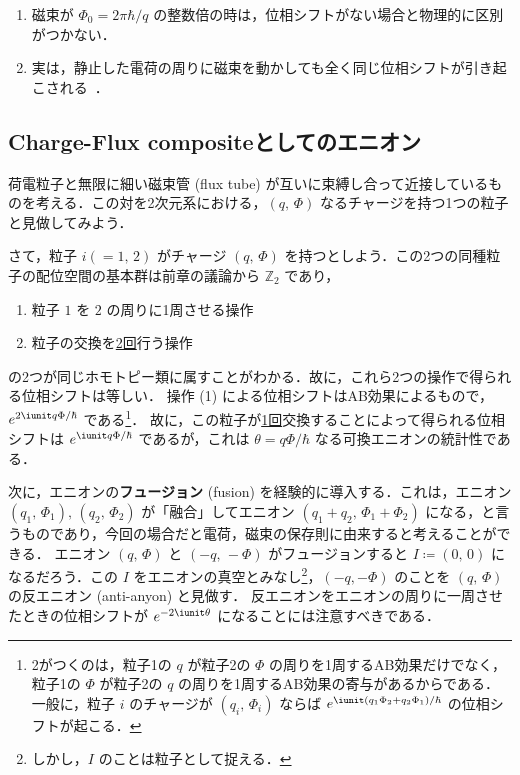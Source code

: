 \documentclass[TQFT_main]{subfiles}
\begin{document}
\begin{enumerate}
    \item 磁束が $\Phi_0 = 2\pi \hbar / q $ の整数倍の時は，位相シフトがない場合と物理的に区別がつかない．
    \item 実は，静止した電荷の周りに磁束を動かしても全く同じ位相シフトが引き起こされる~\cite{Aharonov1984}．
\end{enumerate}

\subsection{Charge-Flux compositeとしてのエニオン}

荷電粒子と無限に細い磁束管 (flux tube) が互いに束縛し合って近接しているものを考える．この対を2次元系における，$(q,\, \Phi)$ なるチャージを持つ1つの粒子と見做してみよう．

さて，粒子 $i (=1,\, 2)$ がチャージ $(q,\, \Phi)$ を持つとしよう．この2つの同種粒子の配位空間の基本群は前章の議論から $\mathbb{Z}_2$ であり，
\begin{enumerate}
    \item 粒子 $1$ を $2$ の周りに1周させる操作
    \item 粒子の交換を\underline{2回}行う操作
\end{enumerate}
の2つが同じホモトピー類に属すことがわかる．故に，これら2つの操作で得られる位相シフトは等しい．
操作 (1) による位相シフトはAB効果によるもので，$e^{2\iunit q \Phi /\hbar}$ である\footnote{2がつくのは，粒子1の $q$ が粒子2の $\Phi$ の周りを1周するAB効果だけでなく，粒子1の $\Phi$ が粒子2の $q$ の周りを1周するAB効果の寄与があるからである．一般に，粒子 $i$ のチャージが $(q_i,\, \Phi_i)$ ならば $e^{\iunit (q_1 \Phi_2 + q_2 \Phi_1) / \hbar}$ の位相シフトが起こる．}．
故に，この粒子が\underline{1回}交換することによって得られる位相シフトは $e^{\iunit q \Phi /\hbar}$ であるが，これは $\theta = q \Phi / \hbar$ なる可換エニオンの統計性である．


次に，エニオンの\textbf{フュージョン} (fusion) を経験的に導入する．これは，エニオン $(q_1,\, \Phi_1),\, (q_2,\, \Phi_2)$ が「融合」してエニオン $(q_1 + q_2,\, \Phi_1 + \Phi_2)$ になる，と言うものであり，今回の場合だと電荷，磁束の保存則に由来すると考えることができる．
エニオン $(q,\, \Phi)$ と $(-q,\, -\Phi)$ がフュージョンすると $I \coloneqq (0,\, 0)$ になるだろう．この $I$ をエニオンの真空とみなし\footnote{しかし，$I$ のことは粒子として捉える．}，$(-q, -\Phi)$ のことを $(q,\, \Phi)$ の反エニオン (anti-anyon) と見做す．
反エニオンをエニオンの周りに一周させたときの位相シフトが $e^{-2\iunit \theta}$ になることには注意すべきである．
\end{document}
